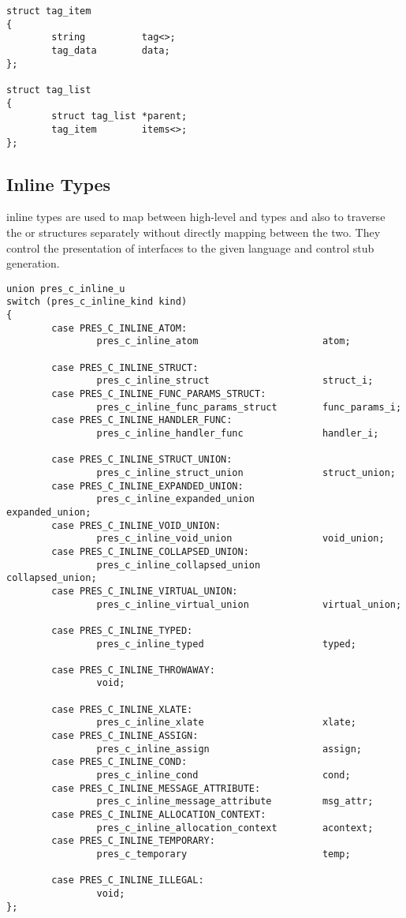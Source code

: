 \begin{verbatim}
struct tag_item
{
        string          tag<>;
        tag_data        data;
};

struct tag_list
{
        struct tag_list *parent;
        tag_item        items<>;
};
\end{verbatim}



\subsection{Inline Types}
\label{subsec:PRESC:Inline Types}

\PRESC{} inline types are used to map between high-level \MINT{} and \CAST{}
types and also to traverse the \MINT{} or \CAST{} structures separately without
directly mapping between the two.  They control the presentation of interfaces
to the given language and control stub generation.

\begin{verbatim}
union pres_c_inline_u
switch (pres_c_inline_kind kind)
{
        case PRES_C_INLINE_ATOM:
                pres_c_inline_atom                      atom;

        case PRES_C_INLINE_STRUCT:
                pres_c_inline_struct                    struct_i;
        case PRES_C_INLINE_FUNC_PARAMS_STRUCT:
                pres_c_inline_func_params_struct        func_params_i;
        case PRES_C_INLINE_HANDLER_FUNC:
                pres_c_inline_handler_func              handler_i;

        case PRES_C_INLINE_STRUCT_UNION:
                pres_c_inline_struct_union              struct_union;
        case PRES_C_INLINE_EXPANDED_UNION:
                pres_c_inline_expanded_union            expanded_union;
        case PRES_C_INLINE_VOID_UNION:
                pres_c_inline_void_union                void_union;
        case PRES_C_INLINE_COLLAPSED_UNION:
                pres_c_inline_collapsed_union           collapsed_union;
        case PRES_C_INLINE_VIRTUAL_UNION:
                pres_c_inline_virtual_union             virtual_union;

        case PRES_C_INLINE_TYPED:
                pres_c_inline_typed                     typed;

        case PRES_C_INLINE_THROWAWAY:
                void;

        case PRES_C_INLINE_XLATE:
                pres_c_inline_xlate                     xlate;
        case PRES_C_INLINE_ASSIGN:
                pres_c_inline_assign                    assign;
        case PRES_C_INLINE_COND:
                pres_c_inline_cond                      cond;
        case PRES_C_INLINE_MESSAGE_ATTRIBUTE:
                pres_c_inline_message_attribute         msg_attr;
        case PRES_C_INLINE_ALLOCATION_CONTEXT:
                pres_c_inline_allocation_context        acontext;
        case PRES_C_INLINE_TEMPORARY:
                pres_c_temporary                        temp;

        case PRES_C_INLINE_ILLEGAL:
                void;
};
\end{verbatim}

